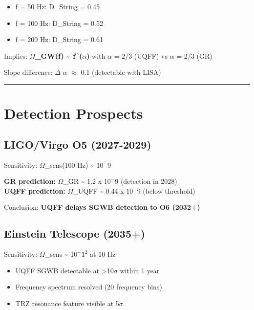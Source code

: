\documentclass[12pt,a4paper]{article}
\begin{document}
\begin{itemize}
  \item f = 50 Hz: D\_String = 0.45
  \item f = 100 Hz: D\_String = 0.52
  \item f = 200 Hz: D\_String = 0.61
\end{itemize}

Implies: \textbf{$\Omega$\_GW(f) \textasciitilde{}  f\^{}($\alpha$)} with $\alpha$ = 2/3 (UQFF) vs $\alpha$ = 2/3 (GR)

Slope difference: $\Delta$ $\alpha$ $\approx$ 0.1 (detectable with LISA)

\medskip\hrule\medskip

\section{Detection Prospects}

\subsection{LIGO/Virgo O5 (2027-2029)}

Sensitivity: $\Omega$\_sens(100 Hz) \textasciitilde{} 1$0^{-}$9

\begin{flushleft}
\textbf{GR prediction:} $\Omega$\_GR \textasciitilde{} 1.2 x 1$0^{-}$9 (detection in 2028) \\
\textbf{UQFF prediction:} $\Omega$\_UQFF \textasciitilde{} 0.44 x 1$0^{-}$9 (below threshold) \\
\end{flushleft}

Conclusion: \textbf{UQFF delays SGWB detection to O6 (2032+)}

\subsection{Einstein Telescope (2035+)}

Sensitivity: $\Omega$\_sens \textasciitilde{} 1$0^{-}$$1^{2}$ at 10 Hz

\begin{itemize}
  \item UQFF SGWB detectable at >10$\sigma$ within 1 year
  \item Frequency spectrum resolved (20 frequency bins)
  \item TRZ resonance feature visible at 5$\sigma$
\end{itemize}
\end{document}
